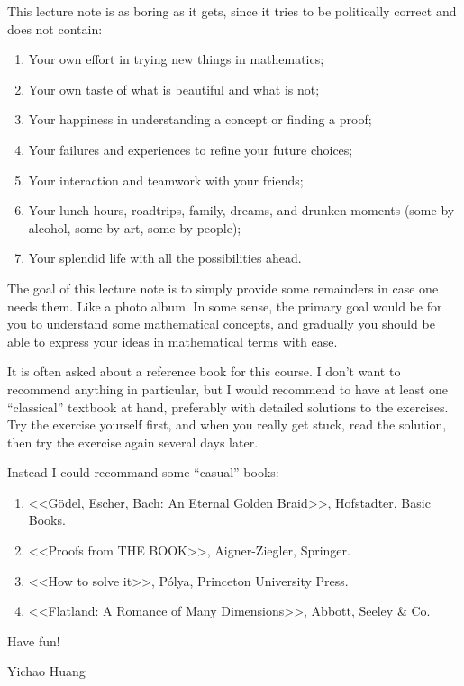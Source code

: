 \documentclass[
	fontsize=10pt, %
	twoside=true, %
	secnumdepth=1, %
	numbers=noenddot, %
]{kaobook}
\begin{document}
This lecture note is as boring as it gets, since it tries to be politically correct and does not contain:
\begin{enumerate}
	\item Your own effort in trying new things in mathematics;
	\item Your own taste of what is beautiful and what is not;
	\item Your happiness in understanding a concept or finding a proof;
	\item Your failures and experiences to refine your future choices;
	\item Your interaction and teamwork with your friends;
	\item Your lunch hours, roadtrips, family, dreams, and drunken moments (some by alcohol, some by art, some by people);
	\item Your splendid life with all the possibilities ahead.
\end{enumerate}
The goal of this lecture note is to simply provide some remainders in case one needs them. Like a photo album. In some sense, the primary goal would be for you to understand some mathematical concepts, and gradually you should be able to express your ideas in mathematical terms with ease.

It is often asked about a reference book for this course. I don't want to recommend anything in particular, but I would recommend to have at least one ``classical'' textbook at hand, preferably with detailed solutions to the exercises. Try the exercise yourself first, and when you really get stuck, read the solution, then try the exercise again several days later.

Instead I could recommand some ``casual'' books:
\begin{enumerate}
	\item <<Gödel, Escher, Bach: An Eternal Golden Braid>>, Hofstadter, Basic Books.
	\item <<Proofs from THE BOOK>>, Aigner-Ziegler, Springer.
	\item <<How to solve it>>, Pólya, Princeton University Press.
	\item <<Flatland: A Romance of Many Dimensions>>, Abbott, Seeley \& Co.
\end{enumerate}

\begin{flushright}
Have fun!

Yichao Huang
\end{flushright}
\end{document}
